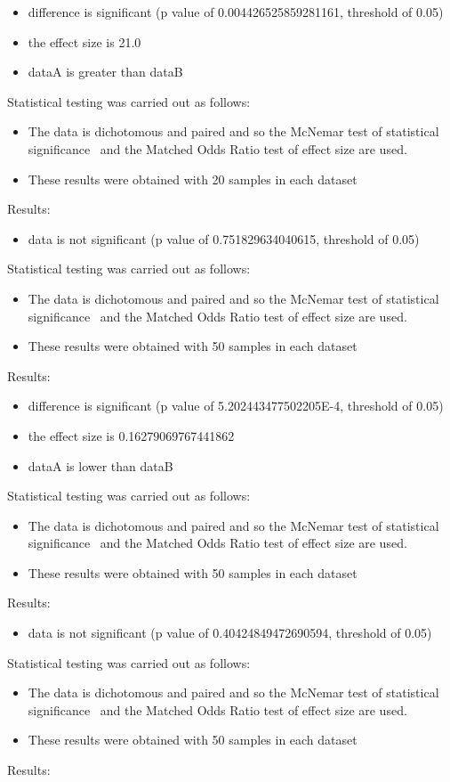 \documentclass[]{article}
\begin{document}
\begin{itemize}
\item{difference is significant (p value of 0.004426525859281161, threshold of 0.05)}
\item{the effect size is 21.0}
\item{dataA is greater than dataB}
\end{itemize}Statistical testing was carried out as follows: \begin{itemize}
\item{The data is dichotomous and paired and so the McNemar test of statistical significance~\cite{Gibbons2011} and the Matched Odds Ratio test of effect size are used.}
\item{These results were obtained with 20 samples in each dataset}
\end{itemize}Results:
\begin{itemize}
\item{data is not significant (p value of 0.751829634040615, threshold of 0.05)}
\end{itemize}Statistical testing was carried out as follows: \begin{itemize}
\item{The data is dichotomous and paired and so the McNemar test of statistical significance~\cite{Gibbons2011} and the Matched Odds Ratio test of effect size are used.}
\item{These results were obtained with 50 samples in each dataset}
\end{itemize}Results:
\begin{itemize}
\item{difference is significant (p value of 5.202443477502205E-4, threshold of 0.05)}
\item{the effect size is 0.16279069767441862}
\item{dataA is lower than dataB}
\end{itemize}Statistical testing was carried out as follows: \begin{itemize}
\item{The data is dichotomous and paired and so the McNemar test of statistical significance~\cite{Gibbons2011} and the Matched Odds Ratio test of effect size are used.}
\item{These results were obtained with 50 samples in each dataset}
\end{itemize}Results:
\begin{itemize}
\item{data is not significant (p value of 0.40424849472690594, threshold of 0.05)}
\end{itemize}Statistical testing was carried out as follows: \begin{itemize}
\item{The data is dichotomous and paired and so the McNemar test of statistical significance~\cite{Gibbons2011} and the Matched Odds Ratio test of effect size are used.}
\item{These results were obtained with 50 samples in each dataset}
\end{itemize}Results:
\end{document}
